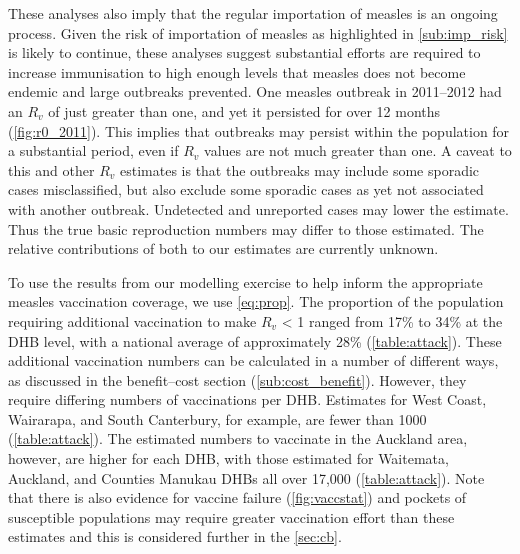 \documentclass{article}
\begin{document}
These analyses also imply that the regular importation of measles is an ongoing process. Given the risk of importation of measles as highlighted in \autoref{sub:imp_risk} is likely to continue, these analyses suggest substantial efforts are required to increase immunisation to high enough levels that measles does not become endemic and large outbreaks prevented. One measles outbreak in 2011--2012 had an $R_v$ of just greater than one, and yet it persisted for over 12 months (\autoref{fig:r0_2011}). This implies that outbreaks may persist within the population for a substantial period, even if $R_v$ values are not much greater than one. A caveat to this and other $R_v$ estimates is that the outbreaks may include some sporadic cases misclassified, but also exclude some sporadic cases as yet not associated with another outbreak. Undetected and unreported cases may lower the estimate. Thus the true basic reproduction numbers may differ to those estimated. The relative contributions of both to our estimates are currently unknown. 

To use the results from our modelling exercise to help inform the appropriate measles vaccination coverage, we use \autoref{eq:prop}. The proportion of the population requiring additional vaccination to make $R_v$ < 1 ranged from 17\% to 34\% at the DHB level, with a national average of approximately 28\% (\autoref{table:attack}). These additional vaccination numbers can be calculated in a number of different ways, as discussed in the benefit--cost section (\autoref{sub:cost_benefit}). However, they require differing numbers of vaccinations per DHB. Estimates for West Coast, Wairarapa, and South Canterbury, for example, are fewer than 1000 (\autoref{table:attack}). The estimated numbers to vaccinate in the Auckland area, however, are higher for each DHB, with those estimated for Waitemata, Auckland, and Counties Manukau DHBs all over 17,000  (\autoref{table:attack}). Note that there is also evidence for vaccine failure (\autoref{fig:vaccstat}) and pockets of susceptible populations \citep{glass4} may require greater vaccination effort than these estimates and this is considered further in the \autoref{sec:cb}.
\end{document}
